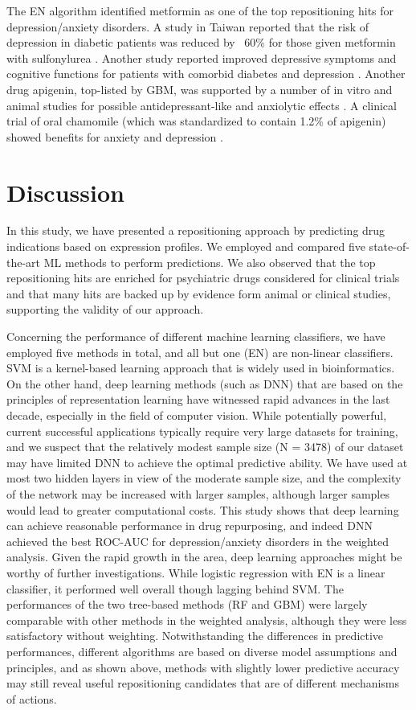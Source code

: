       The EN algorithm identified metformin as one of the top repositioning hits for depression/anxiety disorders. A study in Taiwan reported that the risk of depression in diabetic patients was reduced by ~60\% for those given metformin with sulfonylurea \cite{wahlqvist2012increased}. Another study reported improved depressive symptoms and cognitive functions for patients with comorbid diabetes and depression \cite{guo2014metformin}. Another drug apigenin, top-listed by GBM, was supported by a number of in vitro and animal studies for possible antidepressant-like and anxiolytic effects \cite{pathak2013natural}. A clinical trial of oral chamomile (which was standardized to contain 1.2\% of apigenin) showed benefits for anxiety and depression \cite{amsterdam2009randomized,amsterdam2012chamomile}.
  
\section{Discussion}
  In this study, we have presented a repositioning approach by predicting drug indications based on expression profiles. We employed and compared five state-of-the-art ML methods to perform predictions. We also observed that the top repositioning hits are enriched for psychiatric drugs considered for clinical trials and that many hits are backed up by evidence form animal or clinical studies, supporting the validity of our approach.

  Concerning the performance of different machine learning classifiers, we have employed five methods in total, and all but one (EN) are non-linear classifiers. SVM is a kernel-based learning approach that is widely used in bioinformatics. On the other hand, deep learning methods (such as DNN) that are based on the principles of representation learning \cite{bengio2013representation} have witnessed rapid advances in the last decade, especially in the field of computer vision. While potentially powerful, current successful applications typically require very large datasets for training, and we suspect that the relatively modest sample size (N = 3478) of our dataset may have limited DNN to achieve the optimal predictive ability. We have used at most two hidden layers in view of the moderate sample size, and the complexity of the network may be increased with larger samples, although larger samples would lead to greater computational costs. This study shows that deep learning can achieve reasonable performance in drug repurposing, and indeed DNN achieved the best ROC-AUC for depression/anxiety disorders in the weighted analysis. Given the rapid growth in the area, deep learning approaches might be worthy of further investigations. While logistic regression with EN is a linear classifier, it performed well overall though lagging behind SVM. The performances of the two tree-based methods (RF and GBM) were largely comparable with other methods in the weighted analysis, although they were less satisfactory without weighting. Notwithstanding the differences in predictive performances, different algorithms are based on diverse model assumptions and principles, and as shown above, methods with slightly lower predictive accuracy may still reveal useful repositioning candidates that are of different mechanisms of actions. 

